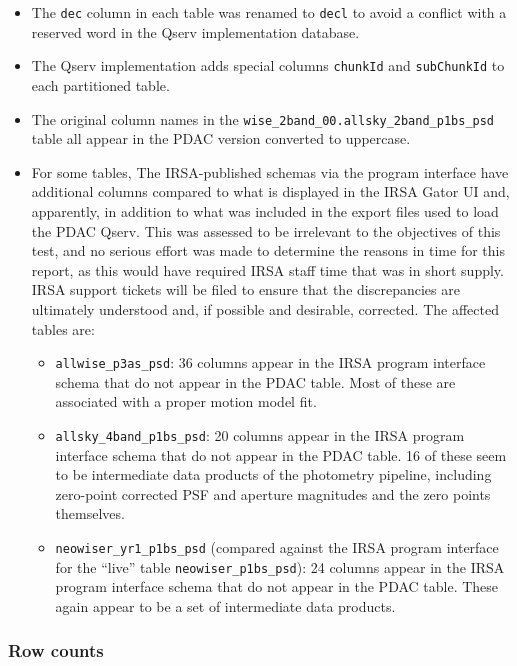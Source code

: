 \documentclass[DM,lsstdraft,STR,toc]{lsstdoc}
\begin{document}
\begin{itemize}
\item The \verb|dec| column in each table was renamed to \verb|decl| to avoid a conflict with a reserved word in the Qserv implementation database.
\item The Qserv implementation adds special columns \verb|chunkId| and \verb|subChunkId| to each partitioned table.
\item The original column names in the \verb|wise_2band_00.allsky_2band_p1bs_psd| table all appear in the PDAC version converted to uppercase.
\item For some tables, The IRSA-published schemas via the program interface have additional columns compared to what is displayed in the IRSA Gator UI and, apparently, in addition to what was included in the export files used to load the PDAC Qserv.  
This was assessed to be irrelevant to the objectives of this test, and no serious effort was made to determine the reasons in time for this report, as this would have required IRSA staff time that was in short supply.
IRSA support tickets will be filed to ensure that the discrepancies are ultimately understood and, if possible and desirable, corrected.
The affected tables are:
  \begin{itemize}
  \item \verb|allwise_p3as_psd|: 36 columns appear in the IRSA program interface schema that do not appear in the PDAC table.
    Most of these are associated with a proper motion model fit.
  \item \verb|allsky_4band_p1bs_psd|: 20 columns appear in the IRSA program interface schema that do not appear in the PDAC table.
    16 of these seem to be intermediate data products of the photometry pipeline, including zero-point corrected PSF and aperture magnitudes and the zero points themselves.
  \item \verb|neowiser_yr1_p1bs_psd| (compared against the IRSA program interface for the ``live'' table \verb|neowiser_p1bs_psd|): 24 columns appear in the IRSA program interface schema that do not appear in the PDAC table.  
    These again appear to be a set of intermediate data products.
  \end{itemize}
\end{itemize}

\subsubsection{Row counts}
\label{sect:lsp-00-00-api-count}
\end{document}
